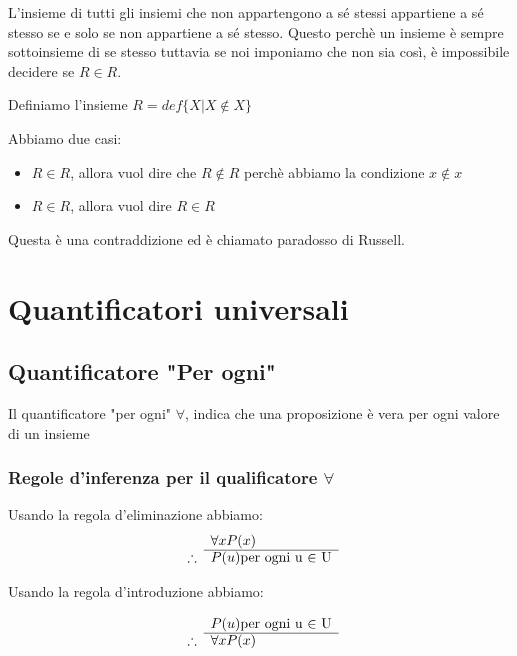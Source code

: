 \documentclass[a4paper]{article}
\begin{document}
L'insieme di tutti gli insiemi che non appartengono a sé stessi appartiene a sé stesso se e solo se non appartiene a sé stesso. Questo perchè un insieme è sempre sottoinsieme di se stesso tuttavia se noi imponiamo che non sia così, è impossibile decidere se $R \in R$.

Definiamo l'insieme $R = def\{X | X \notin X\}$

Abbiamo due casi:
\begin{itemize}
	\item $R \in R$, allora vuol dire che $R \notin R$ perchè abbiamo la condizione $x \notin x$
	\item $R \in R$, allora vuol dire $R \in R$
\end{itemize}

Questa è una contraddizione ed è chiamato paradosso di Russell.


\section{Quantificatori universali}

\subsection{Quantificatore "Per ogni"}

Il quantificatore "per ogni" $ \forall $, indica che una proposizione è vera per ogni valore di un insieme

\subsubsection{Regole d'inferenza per il qualificatore $ \forall $}

Usando la regola d'eliminazione abbiamo:
\[
\begin{array}{ r l }
	& \forall xP(x) \\
	\cline{2-2}
	\therefore & P(u) \text{per ogni u $ \in $ U}
\end{array}
\]

Usando la regola d'introduzione abbiamo:

\[
\begin{array}{ r l }
	& P(u) \text{per ogni u $ \in $ U} \\
	\cline{2-2}
	\therefore & \forall xP(x)
\end{array}
\]
\end{document}
